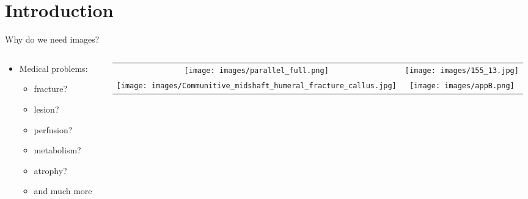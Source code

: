 \section{Introduction}

\begin{frame}[c]{Why do we need images?}

	\begin{columns}[c]
		\begin{column}{0.4\textwidth}

			\begin{itemize}
				\item Medical problems:
				      \begin{itemize}
					      \item fracture?
					      \item lesion?
					      \item perfusion?
					      \item metabolism?
					      \item atrophy?
					      \item and much more
				      \end{itemize}
			\end{itemize}
		\end{column}\begin{column}{0.5\textwidth}
			\begin{tabular}{cc}
				\texttt{[image: images/parallel\_full.png]}                                                               & \texttt{[image: images/155\_13.jpg]} \\
				\texttt{[image: images/Communitive\_midshaft\_humeral\_fracture\_callus.jpg]} &
				\texttt{[image: images/appB.png]}%
			\end{tabular}
		\end{column}
	\end{columns}

\end{frame}

